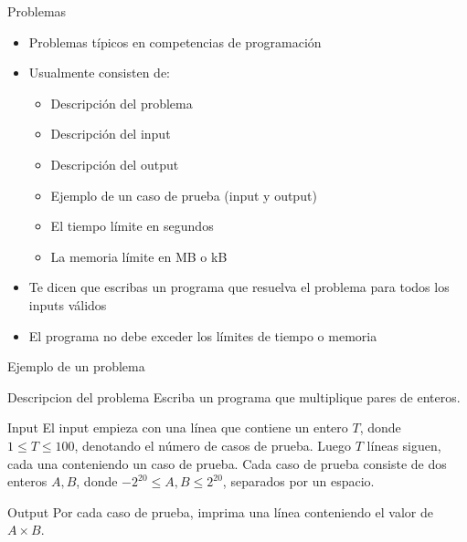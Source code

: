 \documentclass[10pt]{beamer}
\newcommand{\bi}{\begin{itemize}}
\newcommand{\ei}{\end{itemize}}
\begin{document}
\begin{frame}{Problemas}
    \bi
        \item Problemas típicos en competencias de programación
        \item Usualmente consisten de:
            \bi
                \item Descripción del problema
                \item Descripción del input
                \item Descripción del output
                \item Ejemplo de un caso de prueba (input y output)
                \item El tiempo límite en segundos
                \item La memoria límite en MB o kB
            \ei
        \item Te dicen que escribas un programa que resuelva el problema para todos los inputs válidos
        \item El programa no debe exceder los límites de tiempo o memoria
    \ei
\end{frame}

\begin{frame}{Ejemplo de un problema}
    \begin{block}{Descripcion del problema}
    Escriba un programa que multiplique pares de enteros.
    \end{block}

    \vspace{10pt}

    \begin{block}{Input}
    El input empieza con una línea que contiene un entero $T$, donde $1\leq T \leq
    100$, denotando el número de casos de prueba. Luego $T$ líneas siguen, cada
    una conteniendo un caso de prueba. Cada caso de prueba consiste de dos enteros $A,B$,
    donde $-2^{20} \leq A,B \leq 2^{20}$, separados por un espacio.
    \end{block}

    \vspace{10pt}

    \begin{block}{Output}
    Por cada caso de prueba, imprima una línea conteniendo el valor de $A\times B$.
    \end{block}
\end{frame}
\end{document}
